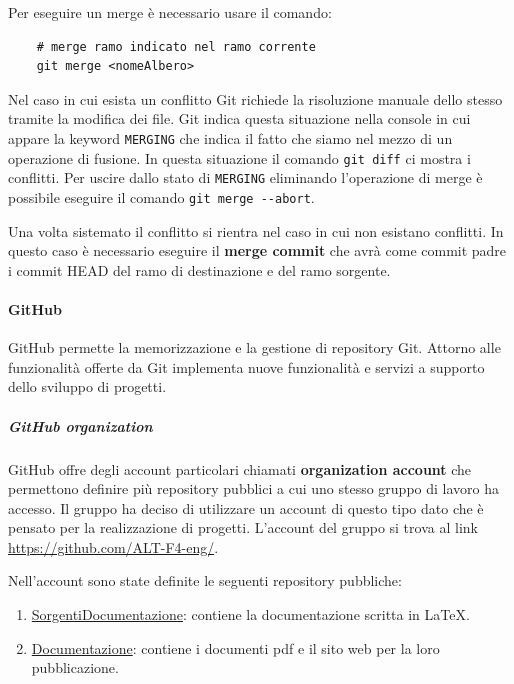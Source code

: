 Per eseguire un merge è necessario usare il comando:
\begin{lstlisting}
    # merge ramo indicato nel ramo corrente
    git merge <nomeAlbero>
\end{lstlisting}

Nel caso in cui esista un conflitto Git richiede la risoluzione manuale dello stesso tramite la modifica dei file.
Git indica questa situazione nella console in cui appare la keyword \texttt{MERGING} che indica il fatto che siamo nel mezzo di un operazione di fusione.
In questa situazione il comando \lstinline|git diff| ci mostra i conflitti.
Per uscire dallo stato di \texttt{MERGING} eliminando l'operazione di merge è possibile eseguire il comando \lstinline|git merge --abort|.

Una volta sistemato il conflitto si rientra nel caso in cui non esistano conflitti.
In questo caso è necessario eseguire il \textbf{merge commit} che avrà come commit padre i  commit HEAD del ramo di destinazione e del 
ramo sorgente.

\paragraph{GitHub}
GitHub permette la memorizzazione e la gestione di repository Git.
Attorno alle funzionalità offerte da Git implementa nuove funzionalità e servizi a supporto dello sviluppo di progetti.

\subparagraph{GitHub organization}
GitHub offre degli account particolari chiamati \textbf{organization account} che permettono definire più repository pubblici a cui uno stesso gruppo di lavoro ha accesso.
Il gruppo ha deciso di utilizzare un account di questo tipo dato che è pensato per la realizzazione di progetti.
L'account del gruppo si trova al link \href{https://github.com/ALT-F4-eng/}{https://github.com/ALT-F4-eng/}.

Nell'account sono state definite le seguenti repository pubbliche:
\begin{enumerate}
    \item \href{https://github.com/ALT-F4-eng/SorgentiDocumentazione}{SorgentiDocumentazione}: contiene la documentazione scritta in LaTeX.
    \item \href{https://github.com/ALT-F4-eng/Documentazione}{Documentazione}: contiene i documenti pdf e il sito web per la loro pubblicazione.
\end{enumerate}

